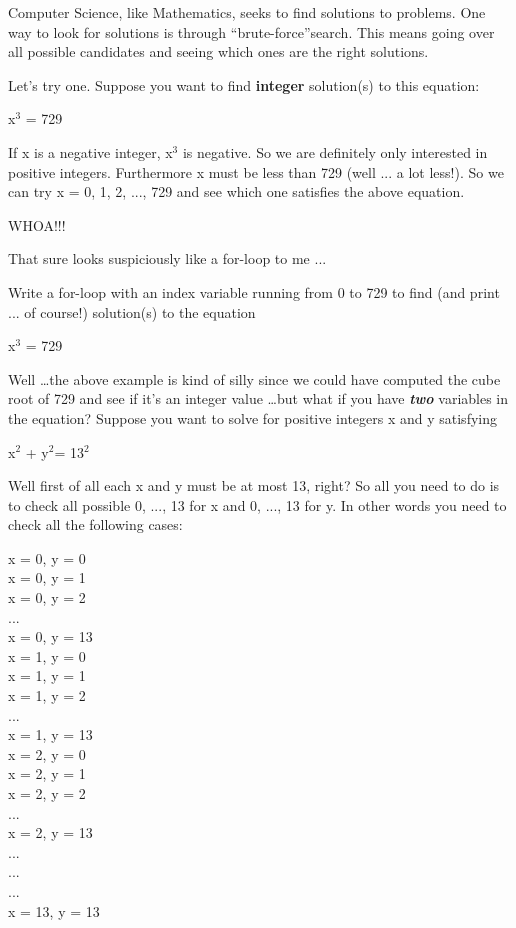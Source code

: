 \begin{console}
\newpage{}

Computer Science, like Mathematics, seeks to find solutions to problems.
One way to look for solutions is through ``brute-force''search. This
means going over all possible candidates and seeing which ones are the
right solutions.

Let's try one. Suppose you want to find \textbf{integer} solution(s) to this equation:
\begin{center}
x$^{3}$ = 729
\end{center}
If x is a negative integer, x$^{3}$ is negative. So we are definitely only interested in positive integers. Furthermore x must be less than 729 (well ... a lot less!). So we can try x = 0, 1, 2, ..., 729 and see which one satisfies the above equation.

WHOA!!!

That sure looks suspiciously like a for-loop to me ...

\begin{ex}
Write a for-loop with an index variable running from
0 to 729 to find (and print ... of course!) solution(s) to the equation

\begin{center}
x$^{3}$ = 729
\end{center}
\end{ex}
Well \ldots the above example is kind of silly since we could have
computed the cube root of 729 and see if it's an integer
value \ldots but what if you have \textit{\textbf{two}} variables in the
equation? Suppose you want to solve for positive integers x and y
satisfying

\begin{center}
x$^{2}$ + y$^{2}$= 13$^{2}$
\end{center}

Well first of all each x and y must be at most 13, right? So all you
need to do is to check all possible 0, ..., 13 for x and 0, ..., 13 for
y. In other words you need to check all the following cases:

x = 0, y = 0\\
x = 0, y = 1\\
x = 0, y = 2\\
...\\
x = 0, y = 13\\
x = 1, y = 0\\
x = 1, y = 1\\
x = 1, y = 2\\
...\\
x = 1, y = 13\\
x = 2, y = 0\\
x = 2, y = 1\\
x = 2, y = 2\\
...\\
x = 2, y = 13\\
...\\
...\\
...\\
x = 13, y = 13\\


\end{console}
